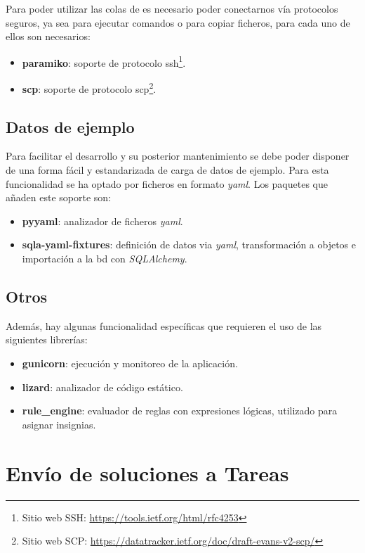 \documentclass[11pt,spanish,listoffigures,listoftables]{tfgetsinf}
\begin{document}
Para poder utilizar las \Gls{cola}s de \kahan es necesario poder conectarnos vía protocolos seguros, ya sea para ejecutar comandos o para copiar ficheros, para cada uno de ellos son necesarios:

\begin{itemize}
	\item \textbf{paramiko}: soporte de protocolo \acrfull{ssh}\footnote{Sitio web SSH: \url{https://tools.ietf.org/html/rfc4253}}.
	\item \textbf{scp}: soporte de protocolo \acrfull{scp}\footnote{Sitio web SCP: \url{https://datatracker.ietf.org/doc/draft-evans-v2-scp/}}.
\end{itemize}

\subsection{Datos de ejemplo}

Para facilitar el desarrollo y su posterior mantenimiento se debe poder disponer de una forma fácil y estandarizada de carga de datos de ejemplo. Para esta funcionalidad se ha optado por ficheros en formato \textit{yaml}. Los \gls{paquete}s que añaden este soporte son:

\begin{itemize}
    \item \textbf{pyyaml}: analizador de ficheros \textit{yaml}.
	\item \textbf{sqla-yaml-fixtures}: definición de datos via \textit{yaml}, transformación a objetos e importación a la \acrshort{bd} con \textit{SQLAlchemy}.
\end{itemize}

\subsection{Otros}

Además, hay algunas funcionalidad específicas que requieren el uso de las siguientes librerías:

\begin{itemize}
	\item \textbf{gunicorn}: ejecución y monitoreo de la aplicación.
	\item \textbf{lizard}: analizador de código estático.
	\item \textbf{rule\_engine}: evaluador de reglas con expresiones lógicas, utilizado para asignar \Gls{insignia}s.
\end{itemize}


\section{Envío de soluciones a Tareas}
\end{document}
